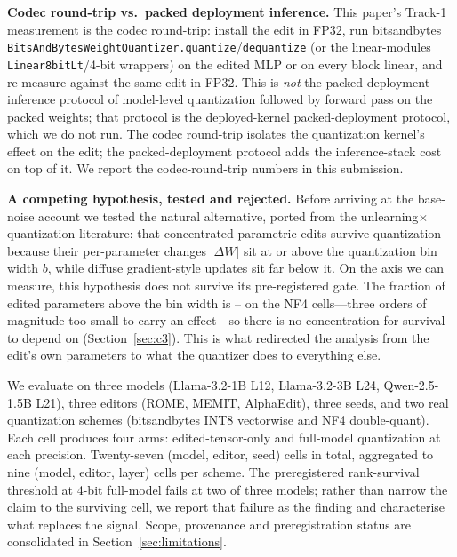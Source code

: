 \documentclass[preprint,12pt]{elsarticle}
\begin{document}
\textbf{Codec round-trip vs.\ packed deployment inference.} This paper's Track-1
measurement is the codec round-trip: install the edit in FP32, run
bitsandbytes \texttt{BitsAndBytesWeightQuantizer.quantize}/\texttt{dequantize}
(or the linear-modules \texttt{Linear8bitLt}/4-bit wrappers) on the edited MLP
or on every block linear, and re-measure against the same edit in FP32. This is
\emph{not} the packed-deployment-inference protocol of model-level quantization
followed by forward pass on the packed weights; that protocol is the deployed-kernel
packed-deployment protocol, which we do not run. The codec round-trip isolates the quantization
kernel's effect on the edit; the packed-deployment protocol adds the inference-stack
cost on top of it. We report the codec-round-trip numbers in this submission.

\textbf{A competing hypothesis, tested and rejected.} Before arriving at the
base-noise account we tested the natural alternative, ported from the
unlearning$\times$quantization literature: that concentrated parametric edits survive
quantization because their per-parameter changes $|\Delta W|$ sit at or above the
quantization bin width $b$, while diffuse gradient-style updates sit far below it. On
the axis we can measure, this hypothesis does not survive its pre-registered gate. The fraction of edited parameters
above the bin width is \pKthreeFaboveMin{}--\pKthreeFaboveMax{} on the NF4 cells---three
orders of magnitude too small to carry an effect---so there is no concentration for
survival to depend on (Section~\ref{sec:c3}). This is what redirected the analysis from
the edit's own parameters to what the quantizer does to everything else.

We evaluate on three models (Llama-3.2-1B L12, Llama-3.2-3B L24, Qwen-2.5-1.5B L21),
three editors (ROME, MEMIT, AlphaEdit), three seeds, and two real quantization schemes
(bitsandbytes INT8 vectorwise and NF4 double-quant). Each cell produces four arms:
edited-tensor-only and full-model quantization at each precision. Twenty-seven (model,
editor, seed) cells in total, aggregated to nine (model, editor, layer) cells per
scheme. The preregistered rank-survival threshold at 4-bit full-model fails at two of
three models; rather than narrow the claim to the surviving cell, we report that failure
as the finding and characterise what replaces the signal. Scope, provenance and
preregistration status are consolidated in Section~\ref{sec:limitations}.

\end{document}
